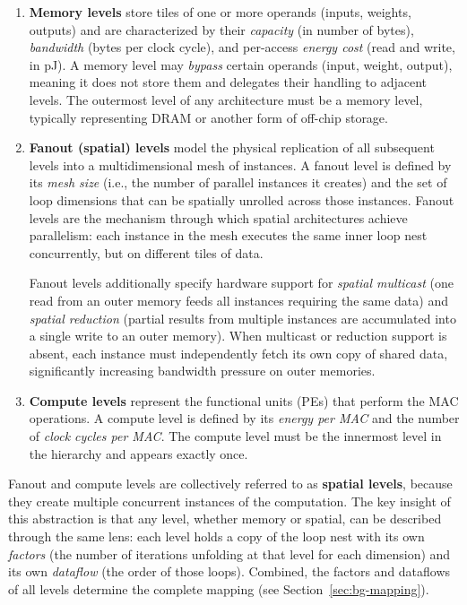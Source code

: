 \begin{enumerate}
  \item \textbf{Memory levels} store tiles of one or more operands
    (inputs, weights, outputs) and are characterized by their
    \emph{capacity} (in number of bytes), \emph{bandwidth} (bytes
    per clock cycle), and per-access \emph{energy cost} (read and write,
    in pJ).
    A memory level may \emph{bypass} certain operands (input, weight, output), meaning it does
    not store them and delegates their handling to adjacent levels.
    The outermost level of any architecture must be a memory level,
    typically representing DRAM or another form of off-chip storage.

  \item \textbf{Fanout (spatial) levels} model the physical replication
    of all subsequent levels into a multidimensional mesh of instances.
    A fanout level is defined by its \emph{mesh size} (i.e., the number
    of parallel instances it creates) and the set of loop dimensions that
    can be spatially unrolled across those instances.
    Fanout levels are the mechanism through which spatial architectures
    achieve parallelism: each instance in the mesh executes the same
    inner loop nest concurrently, but on different tiles of data.

    Fanout levels additionally specify hardware support for
    \emph{spatial multicast} (one read from an outer memory feeds all
    instances requiring the same data) and \emph{spatial reduction}
    (partial results from multiple instances are accumulated into a
    single write to an outer memory).
    When multicast or reduction support is absent, each instance must
    independently fetch its own copy of shared data, significantly
    increasing bandwidth pressure on outer memories.

  \item \textbf{Compute levels} represent the functional units (PEs)
    that perform the MAC operations.
    A compute level is defined by its \emph{energy per MAC} and the
    number of \emph{clock cycles per MAC}.
    The compute level must be the innermost level in the hierarchy and
    appears exactly once.
\end{enumerate}

Fanout and compute levels are collectively referred to as
\textbf{spatial levels}, because they create multiple concurrent
instances of the computation.
The key insight of this abstraction is that any level, whether memory
or spatial, can be described through the same lens: each level holds
a copy of the loop nest with its own \emph{factors} (the number of
iterations unfolding at that level for each dimension) and its own
\emph{dataflow} (the order of those loops).
Combined, the factors and dataflows of all levels determine the
complete mapping (see Section~\ref{sec:bg-mapping}).


